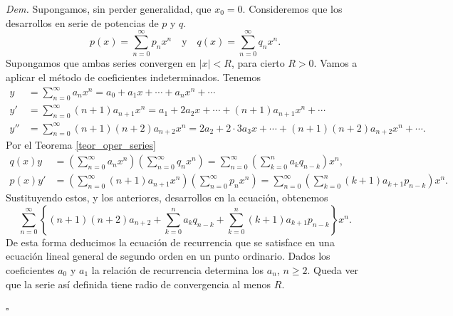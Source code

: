 \documentclass{article}
\newenvironment{demo}{\noindent\emph{Dem.}}{$\square$ \newline\vspace{5pt}}
\begin{document}
\begin{demo}
Supongamos, sin perder generalidad, que $x_0=0$. Consideremos que los desarrollos en serie de potencias de $p$ y $q$.
\begin{equation}\label{eq:series_p_q}p(x)=\sum_{n=0}^{\infty}p_nx^n\quad\text{y}\quad q(x)=\sum_{n=0}^{\infty}q_nx^n.
\end{equation}
Supongamos que ambas series convergen en $|x|<R$, para cierto $R>0$. Vamos a aplicar el método de coeficientes indeterminados. Tenemos
\[
    \begin{split}
      y&=\sum_{n=0}^{\infty}a_nx^n=a_0+a_1x+\cdots+a_nx^n+\cdots\\
      y'&=\sum_{n=0}^{\infty}(n+1)a_{n+1}x^n=a_1+2a_2x+\cdots+(n+1)a_{n+1}x^n+\cdots\\
      y''&=\sum_{n=0}^{\infty}(n+1)(n+2)a_{n+2}x^n= 2a_2+2\cdot 3a_3x+\cdots+(n+1)(n+2)a_{n+2}x^n+\cdots.
    \end{split}
\]
Por el  Teorema \ref{teor_oper_series} 
\[
   \begin{split}
     q(x)y&=\left(\sum_{n=0}^{\infty}a_nx^n\right)\left(\sum_{n=0}^{\infty}q_nx^n\right)=\sum_{n=0}^{\infty}\left(\sum_{k=0}^na_kq_{n-k}\right)x^n,\\
     p(x)y'&=\left(\sum_{n=0}^{\infty}(n+1)a_{n+1}x^n\right)\left(\sum_{n=0}^{\infty}p_nx^n\right)=\sum_{n=0}^{\infty}\left(\sum_{k=0}^n(k+1)a_{k+1}p_{n-k}\right)x^n.
   \end{split}
\]
Sustituyendo estos, y los anteriores, desarrollos en la ecuación, obtenemos
\[\sum_{n=0}^{\infty}\left\{ (n+1)(n+2)a_{n+2}+ \sum_{k=0}^na_kq_{n-k}+ \sum_{k=0}^n(k+1)a_{k+1}p_{n-k} \right\}x^n.\]
De esta forma deducimos la ecuación de recurrencia que se satisface en una ecuación lineal general de segundo orden en un punto ordinario.
Dados los coeficientes $a_0$ y $a_1$ la relación de recurrencia determina los $a_n$, $n\geq 2$. Queda ver que la serie así definida tiene radio de convergencia al menos $R$. 


\end{demo}
\end{document}
